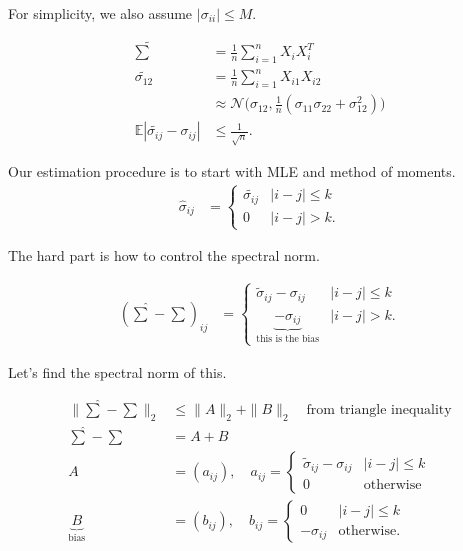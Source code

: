 \documentclass[twoside]{article}
\theoremstyle{definition}
\theoremstyle{definition}
\theoremstyle{remark}
\begin{document}
For simplicity, we also assume $| \sigma_{ii} | \leq M$.

\[
\begin{aligned}
\widetilde{\sum} &= \frac{1}{n} \sum \limits_{i=1}^n X_i X_i^T \\
\widetilde{\sigma_{12}} &= \frac{1}{n} \sum \limits_{i=1}^n X_{i1} X_{i2} \\
&\approx \mathcal{N} \bigg( \sigma_{12}, \frac{1}{n} (\sigma_{11} \sigma_{22} + \sigma_{12}^2) \bigg) \\
\mathbb{E} | \widetilde{\sigma_{ij}} - \sigma_{ij} | &\leq \frac{1}{\sqrt{n}}.
\end{aligned}
\]

Our estimation procedure is to start with MLE and method of moments.
\[
\begin{aligned}
\widehat\sigma_{ij} &= \begin{cases}
\widetilde{\sigma_{ij}} & |i-j| \leq k \\
0 & |i-j|>k.
\end{cases}
\end{aligned}
\]

The hard part is how to control the spectral norm.

\[
\begin{aligned}
(\widehat\sum - \sum)_{ij} &= \begin{cases}
\widetilde\sigma_{ij} - \sigma_{ij} & |i-j| \leq k \\
\underbrace{-\sigma_{ij}}_\text{this is the bias} & |i-j|>k.
\end{cases}
\end{aligned}
\]

Let's find the spectral norm of this.

\[
\begin{aligned}
\| \widehat\sum - \sum \|_2 &\leq \|A\|_2 + \|B\|_2 \quad \text{from triangle inequality} \\
\widehat\sum - \sum &= A + B \\
A &= (a_{ij}), \quad a_{ij} = \begin{cases}
\widetilde\sigma_{ij} - \sigma_{ij} & |i-j|\leq k \\
0 & \text{otherwise}
\end{cases} \\
\underbrace{B}_\text{bias} &= (b_{ij}), \quad b_{ij} = \begin{cases}
0 & |i-j| \leq k \\
-\sigma_{ij} & \text{otherwise}.
\end{cases}
\end{aligned}
\]
\end{document}
